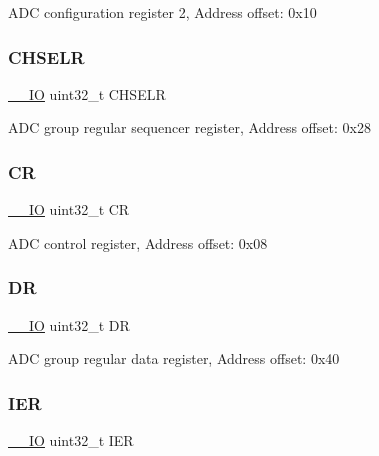 A\+DC configuration register 2, Address offset\+: 0x10 \mbox{\label{struct_a_d_c___type_def_a0ffde5fc9674bafc8a44e80cf36953a3}} 
\subsubsection{\texorpdfstring{C\+H\+S\+E\+LR}{CHSELR}}
{\footnotesize\ttfamily \hyperlink{core__sc300_8h_aec43007d9998a0a0e01faede4133d6be}{\+\_\+\+\_\+\+IO} uint32\+\_\+t C\+H\+S\+E\+LR}

A\+DC group regular sequencer register, Address offset\+: 0x28 \mbox{\label{struct_a_d_c___type_def_ab40c89c59391aaa9d9a8ec011dd0907a}} 
\subsubsection{\texorpdfstring{CR}{CR}}
{\footnotesize\ttfamily \hyperlink{core__sc300_8h_aec43007d9998a0a0e01faede4133d6be}{\+\_\+\+\_\+\+IO} uint32\+\_\+t CR}

A\+DC control register, Address offset\+: 0x08 \mbox{\label{struct_a_d_c___type_def_a3df0d8dfcd1ec958659ffe21eb64fa94}} 
\subsubsection{\texorpdfstring{DR}{DR}}
{\footnotesize\ttfamily \hyperlink{core__sc300_8h_aec43007d9998a0a0e01faede4133d6be}{\+\_\+\+\_\+\+IO} uint32\+\_\+t DR}

A\+DC group regular data register, Address offset\+: 0x40 \mbox{\label{struct_a_d_c___type_def_a6566f8cfbd1d8aa7e8db046aa35e77db}} 
\subsubsection{\texorpdfstring{I\+ER}{IER}}
{\footnotesize\ttfamily \hyperlink{core__sc300_8h_aec43007d9998a0a0e01faede4133d6be}{\+\_\+\+\_\+\+IO} uint32\+\_\+t I\+ER}

